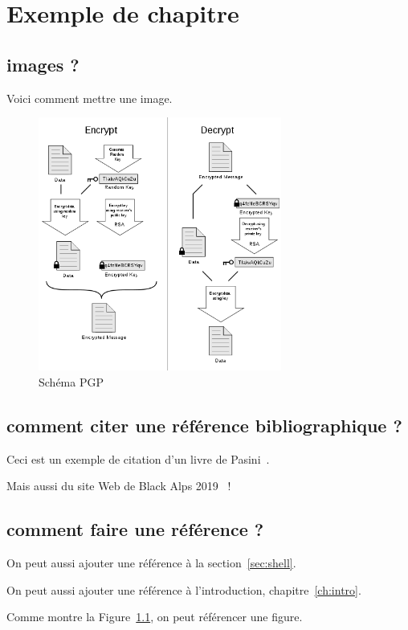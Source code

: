 \chapter{Exemple de chapitre}

\lipsum[1]


\section{images ?}

Voici comment mettre une image.

\begin{figure}
	\centering
	\includegraphics[width=8cm]{images/PGP_101.png}
	\caption{Schéma PGP}
	\label{fig:pgp}
\end{figure}


\section{comment citer une référence bibliographique ?}

Ceci est un exemple de citation d'un livre de Pasini~\cite{pasini2015}.

Mais aussi du site Web de Black Alps 2019~\cite{BA19} !


\section{comment faire une référence ?}

On peut aussi ajouter une référence à la section~\ref{sec:shell}.

On peut aussi ajouter une référence à l'introduction, chapitre~\ref{ch:intro}.

Comme montre la Figure~\ref{fig:pgp}, on peut référencer une figure.


